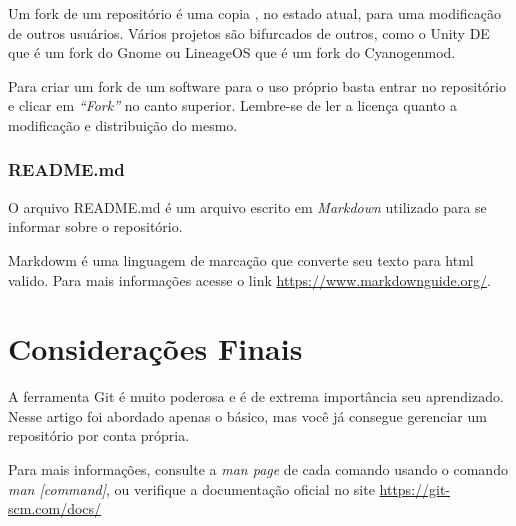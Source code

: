 \documentclass[]{article}
\begin{document}
Um fork de um repositório é uma copia , no estado atual, para uma modificação de outros usuários.
Vários projetos são bifurcados de outros, como o Unity DE que é um fork do Gnome ou LineageOS que é um fork do Cyanogenmod.

Para criar um fork de um software para o uso próprio basta entrar no repositório e clicar em \textit{``Fork''} no canto superior.
Lembre-se de ler a licença quanto a modificação e distribuição do mesmo.

\subsubsection*{README.md}

O arquivo README.md é um arquivo escrito em \textit{Markdown} utilizado para se informar sobre o repositório.

Markdowm é uma linguagem de marcação que converte seu texto para html valido. 
Para mais informações acesse o link \url{https://www.markdownguide.org/}.
\section{Considerações Finais}
A ferramenta Git é muito poderosa e é de extrema importância seu aprendizado.
Nesse artigo foi abordado apenas o básico, mas você já consegue gerenciar um repositório por conta própria.

Para mais informações, consulte  a \textit{man page} de cada comando usando o comando \textit{man [command]}, 
ou  verifique a documentação oficial no site \url{https://git-scm.com/docs/}
\end{document}
